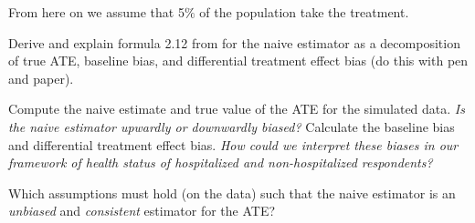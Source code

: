 \noindent From here on we assume that 5$\%$ of the population take the treatment.

\begin{boenumerate}\setcounter{enumi}{1}

\item Derive and explain formula 2.12 from \cite{Morgan.2014} for the naive estimator as a decomposition of true ATE, baseline bias, and differential treatment effect bias (do this with pen and paper).

\item Compute the naive estimate and true value of the ATE for the simulated data. \emph{Is the naive estimator upwardly or downwardly biased?} Calculate the baseline bias and differential treatment effect bias. \emph{How could we interpret these biases in our framework of health status of hospitalized and  non-hospitalized respondents?}

\item Which assumptions must hold (on the data) such that the naive estimator is an \emph{unbiased} and \emph{consistent} estimator for the ATE?

\end{boenumerate}

\nocite{Angrist.2008}
\nocite{NHIS}





